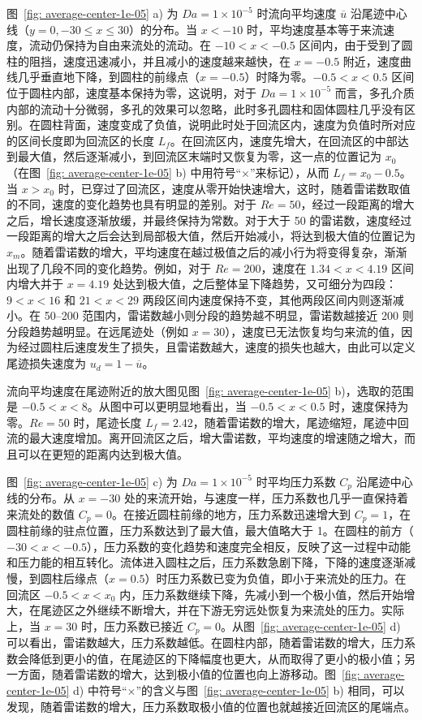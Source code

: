 图~\ref{fig: average-center-1e-05} a) 为 $Da=1\times 10^{-5}$ 时流向平均速度 $\overline{u}$ 沿尾迹中心线（$y=0, -30\leq x\leq 30$）的分布。当 $x<-10$ 时，平均速度基本等于来流速度，流动仍保持为自由来流处的流动。在 $-10<x<-0.5$ 区间内，由于受到了圆柱的阻挡，速度迅速减小，并且减小的速度越来越快，在 $x=-0.5$ 附近，速度曲线几乎垂直地下降，到圆柱的前缘点（$x=-0.5$）时降为零。$-0.5<x<0.5$ 区间位于圆柱内部，速度基本保持为零，这说明，对于 $Da=1\times 10^{-5}$ 而言，多孔介质内部的流动十分微弱，多孔的效果可以忽略，此时多孔圆柱和固体圆柱几乎没有区别。在圆柱背面，速度变成了负值，说明此时处于回流区内，速度为负值时所对应的区间长度即为回流区的长度 $L_f$。在回流区内，速度先增大，在回流区的中部达到最大值，然后逐渐减小，到回流区末端时又恢复为零，这一点的位置记为 $x_0$（在图~\ref{fig: average-center-1e-05} b) 中用符号“$\times$”来标记），从而 $L_f=x_0-0.5$。当 $x>x_0$ 时，已穿过了回流区，速度从零开始快速增大，这时，随着雷诺数取值的不同，速度的变化趋势也具有明显的差别。对于 $Re=50$，经过一段距离的增大之后，增长速度逐渐放缓，并最终保持为常数。对于大于 50 的雷诺数，速度经过一段距离的增大之后会达到局部极大值，然后开始减小，将达到极大值的位置记为 $x_m$。随着雷诺数的增大，平均速度在越过极值之后的减小行为将变得复杂，渐渐出现了几段不同的变化趋势。例如，对于 $Re=200$，速度在 $1.34<x<4.19$ 区间内增大并于 $x=4.19$ 处达到极大值，之后整体呈下降趋势，又可细分为四段：$9<x<16$ 和 $21<x<29$ 两段区间内速度保持不变，其他两段区间内则逐渐减小。在 50--200 范围内，雷诺数越小则分段的趋势越不明显，雷诺数越接近 200 则分段趋势越明显。在远尾迹处（例如 $x=30$），速度已无法恢复均匀来流的值，因为经过圆柱后速度发生了损失，且雷诺数越大，速度的损失也越大，由此可以定义尾迹损失速度为 $u_d=1-\overline{u}$。

流向平均速度在尾迹附近的放大图见图~\ref{fig: average-center-1e-05} b)，选取的范围是 $-0.5<x<8$。从图中可以更明显地看出，当 $-0.5<x<0.5$ 时，速度保持为零。$Re=50$ 时，尾迹长度 $L_f=2.42$，随着雷诺数的增大，尾迹缩短，尾迹中回流的最大速度增加。离开回流区之后，增大雷诺数，平均速度的增速随之增大，而且可以在更短的距离内达到极大值。

图~\ref{fig: average-center-1e-05} c) 为 $Da=1\times 10^{-5}$ 时平均压力系数 $C_p$ 沿尾迹中心线的分布。从 $x=-30$ 处的来流开始，与速度一样，压力系数也几乎一直保持着来流处的数值 $C_p=0$。在接近圆柱前缘的地方，压力系数迅速增大到 $C_p=1$，在圆柱前缘的驻点位置，压力系数达到了最大值，最大值略大于 1。在圆柱的前方（$-30<x<-0.5$），压力系数的变化趋势和速度完全相反，反映了这一过程中动能和压力能的相互转化。流体进入圆柱之后，压力系数急剧下降，下降的速度逐渐减慢，到圆柱后缘点（$x=0.5$）时压力系数已变为负值，即小于来流处的压力。在回流区 $-0.5<x<x_0$ 内，压力系数继续下降，先减小到一个极小值，然后开始增大，在尾迹区之外继续不断增大，并在下游无穷远处恢复为来流处的压力。实际上，当 $x=30$ 时，压力系数已接近 $C_p=0$。从图~\ref{fig: average-center-1e-05} d) 可以看出，雷诺数越大，压力系数越低。在圆柱内部，随着雷诺数的增大，压力系数会降低到更小的值，在尾迹区的下降幅度也更大，从而取得了更小的极小值；另一方面，随着雷诺数的增大，达到极小值的位置也向上游移动。图~\ref{fig: average-center-1e-05} d) 中符号“$\times$”的含义与图~\ref{fig: average-center-1e-05} b) 相同，可以发现，随着雷诺数的增大，压力系数取极小值的位置也就越接近回流区的尾端点。

